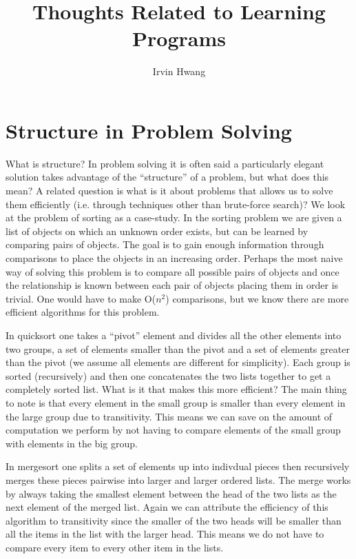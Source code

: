 \documentclass[a4paper,12pt]{article}
\begin{document}
\title{Thoughts Related to Learning Programs}
\author{Irvin Hwang}
\maketitle

\section{Structure in Problem Solving}
What is structure?  In problem solving it is often said a particularly elegant solution takes advantage of the ``structure'' of a problem, but what does this mean?  A related question is what is it about problems that allows us to solve them efficiently (i.e. through techniques other than brute-force search)?  We look at the problem of sorting as a case-study.  In the sorting problem we are given a list of objects on which an unknown order exists, but can be learned by comparing pairs of objects.  The goal is to gain enough information through comparisons to place the objects in an increasing order.  Perhaps the most naive way of solving this problem is to compare all possible pairs of objects and once the relationship is known between each pair of objects placing them in order is trivial.  One would have to make O($n^2$) comparisons, but we know there are more efficient algorithms for this problem.  

In quicksort one takes a ``pivot'' element and divides all the other elements into two groups, a set of elements smaller than the pivot and a set of elements greater than the pivot (we assume all elements are different for simplicity).  Each group is sorted (recursively) and then one concatenates the two lists together to get a completely sorted list.  What is it that makes this more efficient?  The main thing to note is that every element in the small group is smaller than every element in the large group due to transitivity.  This means we can save on the amount of computation we perform by not having to compare elements of the small group with elements in the big group.

In mergesort one splits a set of elements up into indivdual pieces then recursively merges these pieces pairwise into larger and larger ordered lists.   The merge works by always taking the smallest element between the head of the two lists as the next element of the merged list.  Again we can attribute the efficiency of this algorithm to transitivity since the smaller of the two heads will be smaller than all the items in the list with the larger head.  This means we do not have to compare every item to every other item in the lists.
\end{document}
